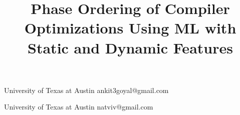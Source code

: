 \documentclass[10pt]{sigplanconf}
\begin{document}
\setlength{\pdfpageheight}{\paperheight}
\setlength{\pdfpagewidth}{\paperwidth}


\doi{}





\title{Phase Ordering of Compiler Optimizations Using ML with Static and Dynamic Features}

           {University of Texas at Austin}
           {ankit3goyal@gmail.com}

           {University of Texas at Austin}
           {natviv@gmail.com}



\maketitle
\end{document}
